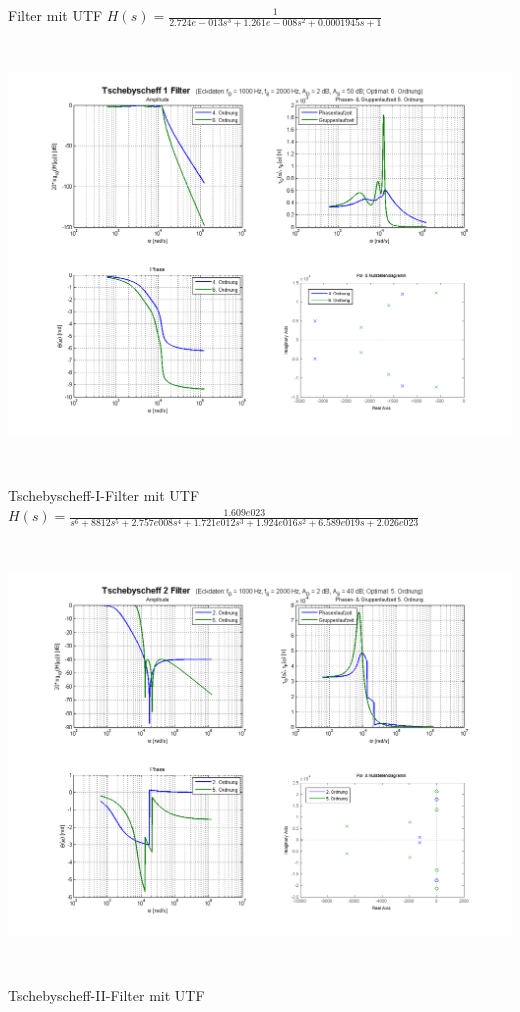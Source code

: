 \begin{center}
Filter mit UTF $H(s) = \frac{1}{2.724e-013 s^3 + 1.261e-008 s^2 + 0.0001945 s +
1}$ 
\includegraphics[height=12cm]{./images/filter-tschebyscheff1.png} \\Tschebyscheff-I-Filter mit UTF $H(s)
= \frac{1.609e023}{s^6 + 8812 s^5 + 2.757e008 s^4 + 1.721e012 s^3 + 1.924e016
s^2 + 6.589e019 s + 2.026e023}$ 
\includegraphics[height=12cm]{./images/filter-tschebyscheff2.png} \\Tschebyscheff-II-Filter mit UTF

\end{center}
